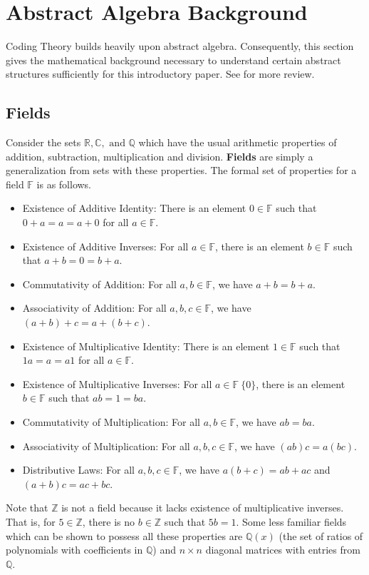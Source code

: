 \documentclass[11pt]{article}
\newcommand{\Z}{\mathbb{Z}}
\newcommand{\R}{\mathbb{R}}
\newcommand{\C}{\mathbb{C}}
\newcommand{\F}{\mathbb{F}}
\newcommand{\Q}{\mathbb{Q}}
\begin{document}
\section{Abstract Algebra Background}

Coding Theory builds heavily upon abstract algebra. Consequently, this section gives the mathematical background necessary to understand certain abstract structures sufficiently for this introductory paper. See \cite[45-60] {codesandcurves} for more review.

\subsection{Fields}

Consider the sets $\R,\C,\text{ and }\Q$ which have the usual arithmetic properties of addition, subtraction, multiplication and division. \textbf{Fields} are simply a generalization from sets with these properties. The formal set of properties for a field $\F$ is as follows.
\begin{itemize}
\item Existence of Additive Identity: There is an element $0\in\F$ such that $0+a=a=a+0$ for all $a\in\F$.
\item Existence of Additive Inverses: For all $a\in\F$, there is an element $b\in\F$ such that $a+b=0=b+a$.
\item Commutativity of Addition: For all $a,b\in\F$, we have $a+b=b+a$.
\item Associativity of Addition: For all $a,b,c\in\F$, we have $(a+b)+c=a+(b+c)$.
\item Existence of Multiplicative Identity: There is an element $1\in\F$ such that $1a=a=a1$ for all $a\in\F$.
\item Existence of Multiplicative Inverses: For all $a\in\F\ \{0\}$, there is an element $b\in\F$ such that $ab=1=ba$.
\item Commutativity of Multiplication: For all $a,b\in\F$, we have $ab=ba$.
\item Associativity of Multiplication: For all $a,b,c\in\F$, we have $(ab)c=a(bc)$.
\item Distributive Laws: For all $a,b,c\in\F$, we have $a(b+c)=ab+ac$ and $(a+b)c=ac+bc$.
\end{itemize}
Note that $\Z$ is not a field because it lacks existence of multiplicative inverses. That is, for $5\in\Z$, there is no $b\in\Z$ such that $5b=1$. Some less familiar fields which can be shown to possess all these properties are $\Q(x)$ (the set of ratios of polynomials with coefficients in $\Q$) and $n\times n$ diagonal matrices with entries from $\Q$.
\end{document}
